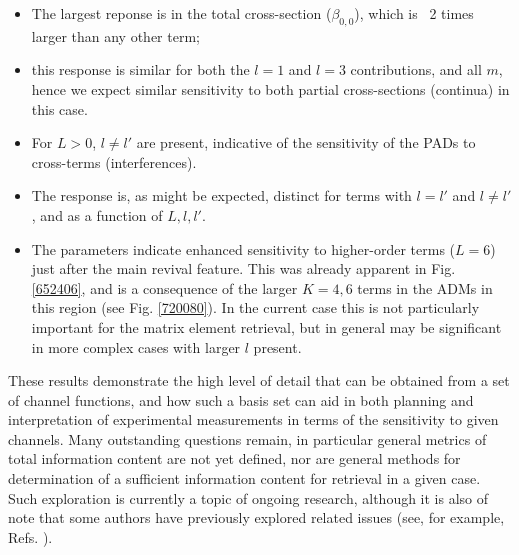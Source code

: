\documentclass[10pt]{article}
\begin{document}
\begin{itemize}
\item The largest reponse is in the total cross-section ($\beta_{0,0}$), which is ~2 times larger than any other term; 
\item this response is similar for both the $l=1$ and $l=3$ contributions, and all $m$, hence we expect similar sensitivity to both partial cross-sections (continua) in this case.
\item For $L>0$, $l\neq l'$ are present, indicative of the sensitivity of the PADs to cross-terms (interferences).
\item The response is, as might be expected, distinct for terms with $l=l'$ and $l\neq l'$, and as a function of $L,l,l'$.
\item The parameters indicate enhanced sensitivity to higher-order terms ($L=6$) just after the main revival feature. This was already apparent in Fig. \ref{652406}, and is a consequence of the larger $K=4,6$ terms in the ADMs in this region (see Fig. \ref{720080}). In the current case this is not particularly important for the matrix element retrieval, but in general may be significant in more complex cases with larger $l$ present.

\end{itemize}

These results demonstrate the high level of detail that can be obtained from a set of channel functions, and how such a basis set can aid in both planning and interpretation of experimental measurements in terms of the sensitivity to given channels. Many outstanding questions remain, in particular general metrics of total information content are not yet defined, nor are general methods for determination of a sufficient information content for retrieval in a given case. Such exploration is currently a topic of ongoing research, although it is also of note that some authors have previously explored related issues (see, for example, Refs. \cite{Schmidtke2000,Ramakrishna2012}).


\end{document}
